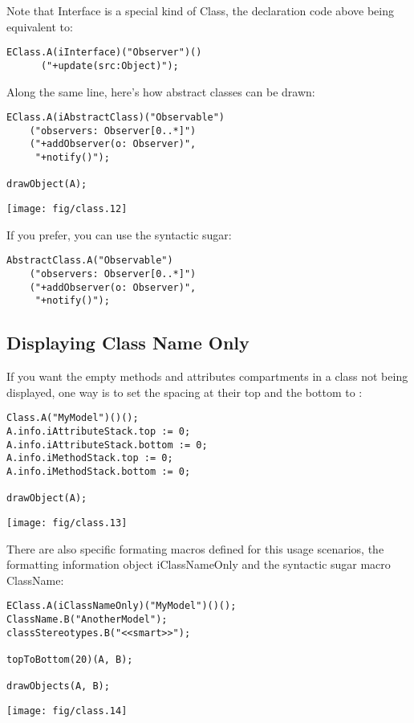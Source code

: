 \documentclass{article}
\newcommand{\code}{\ttfamily}
\begin{document}
Note that {\code Interface} is a special kind of {\code Class}, the declaration code above being equivalent to:
\begin{verbatim}
EClass.A(iInterface)("Observer")()
      ("+update(src:Object)");
\end{verbatim}

Along the same line, here's how abstract classes can be drawn:

\begin{multicols}{2}
\begin{verbatim}
EClass.A(iAbstractClass)("Observable")
    ("observers: Observer[0..*]")
    ("+addObserver(o: Observer)",
     "+notify()");

drawObject(A);
\end{verbatim}
\columnbreak
\hspace{1cm}\texttt{[image: fig/class.12]}
\end{multicols}

If you prefer, you can use the syntactic sugar:

\begin{verbatim}
AbstractClass.A("Observable")
    ("observers: Observer[0..*]")
    ("+addObserver(o: Observer)",
     "+notify()");
\end{verbatim}

\subsection{Displaying Class Name Only}

If you want the empty methods and attributes compartments in a class not being displayed, one way is to set the spacing at their top and the bottom to {\code 0}:

\begin{multicols}{2}
\begin{verbatim}
Class.A("MyModel")()();
A.info.iAttributeStack.top := 0;
A.info.iAttributeStack.bottom := 0;
A.info.iMethodStack.top := 0;
A.info.iMethodStack.bottom := 0;

drawObject(A);
\end{verbatim}
\columnbreak
\hspace{1cm}\texttt{[image: fig/class.13]}
\end{multicols}

There are also specific formating macros defined for this usage scenarios, the formatting information object {\code iClassNameOnly} and the syntactic sugar macro {\code ClassName}:

\begin{multicols}{2}
\begin{verbatim}
EClass.A(iClassNameOnly)("MyModel")()();
ClassName.B("AnotherModel");
classStereotypes.B("<<smart>>");

topToBottom(20)(A, B);

drawObjects(A, B);
\end{verbatim}
\columnbreak
\hspace{2cm}\texttt{[image: fig/class.14]}
\end{multicols}
\end{document}
